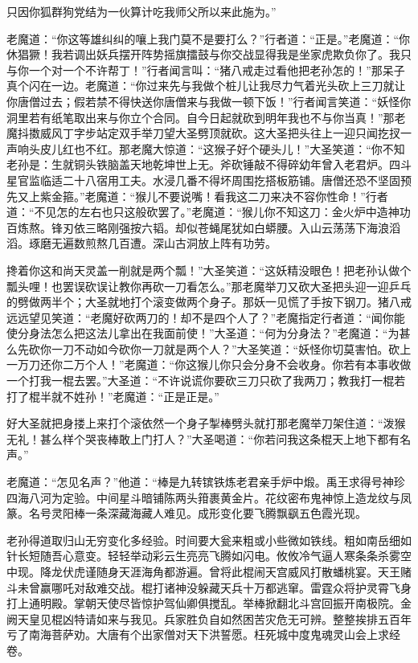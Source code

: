 \documentclass[12pt,UTF8]{ctexbook}
\begin{document}
只因你狐群狗党结为一伙算计吃我师父所以来此施为。”

老魔道：“你这等雄纠纠的嚷上我门莫不是要打么？”行者道：“正是。”老魔道：“你休猖獗！我若调出妖兵摆开阵势摇旗擂鼓与你交战显得我是坐家虎欺负你了。我只与你一个对一个不许帮丁！”行者闻言叫：“猪八戒走过看他把老孙怎的！”那呆子真个闪在一边。老魔道：“你过来先与我做个桩儿让我尽力气着光头砍上三刀就让你唐僧过去；假若禁不得快送你唐僧来与我做一顿下饭！”行者闻言笑道：“妖怪你洞里若有纸笔取出来与你立个合同。自今日起就砍到明年我也不与你当真！”那老魔抖擞威风丁字步站定双手举刀望大圣劈顶就砍。这大圣把头往上一迎只闻扢扠一声响头皮儿红也不红。那老魔大惊道：“这猴子好个硬头儿！”大圣笑道：“你不知老孙是：生就铜头铁脑盖天地乾坤世上无。斧砍锤敲不得碎幼年曾入老君炉。四斗星官监临适二十八宿用工夫。水浸几番不得坏周围扢搭板筋铺。唐僧还恐不坚固预先又上紫金箍。”老魔道：“猴儿不要说嘴！看我这二刀来决不容你性命！”行者道：“不见怎的左右也只这般砍罢了。”老魔道：“猴儿你不知这刀：金火炉中造神功百炼熬。锋刃依三略刚强按六韬。却似苍蝇尾犹如白蟒腰。入山云荡荡下海浪滔滔。琢磨无遍数煎熬几百遭。深山古洞放上阵有功劳。

搀着你这和尚天灵盖一削就是两个瓢！”大圣笑道：“这妖精没眼色！把老孙认做个瓢头哩！也罢误砍误让教你再砍一刀看怎么。”那老魔举刀又砍大圣把头迎一迎乒乓的劈做两半个；大圣就地打个滚变做两个身子。那妖一见慌了手按下钢刀。猪八戒远远望见笑道：“老魔好砍两刀的！却不是四个人了？”老魔指定行者道：“闻你能使分身法怎么把这法儿拿出在我面前使！”大圣道：“何为分身法？”老魔道：“为甚么先砍你一刀不动如今砍你一刀就是两个人？”大圣笑道：“妖怪你切莫害怕。砍上一万刀还你二万个人！”老魔道：“你这猴儿你只会分身不会收身。你若有本事收做一个打我一棍去罢。”大圣道：“不许说谎你要砍三刀只砍了我两刀；教我打一棍若打了棍半就不姓孙！”老魔道：“正是正是。”

好大圣就把身搂上来打个滚依然一个身子掣棒劈头就打那老魔举刀架住道：“泼猴无礼！甚么样个哭丧棒敢上门打人？”大圣喝道：“你若问我这条棍天上地下都有名声。”

老魔道：“怎见名声？”他道：“棒是九转镔铁炼老君亲手炉中煅。禹王求得号神珍四海八河为定验。中间星斗暗铺陈两头箝裹黄金片。花纹密布鬼神惊上造龙纹与凤篆。名号灵阳棒一条深藏海藏人难见。成形变化要飞腾飘飖五色霞光现。

老孙得道取归山无穷变化多经验。时间要大瓮来粗或小些微如铁线。粗如南岳细如针长短随吾心意变。轻轻举动彩云生亮亮飞腾如闪电。攸攸冷气逼人寒条条杀雾空中现。降龙伏虎谨随身天涯海角都游遍。曾将此棍闹天宫威风打散蟠桃宴。天王赌斗未曾赢哪吒对敌难交战。棍打诸神没躲藏天兵十万都逃窜。雷霆众将护灵霄飞身打上通明殿。掌朝天使尽皆惊护驾仙卿俱搅乱。举棒掀翻北斗宫回振开南极院。金阙天皇见棍凶特请如来与我见。兵家胜负自如然困苦灾危无可辨。整整挨排五百年亏了南海菩萨劝。大唐有个出家僧对天下洪誓愿。枉死城中度鬼魂灵山会上求经卷。
\end{document}
